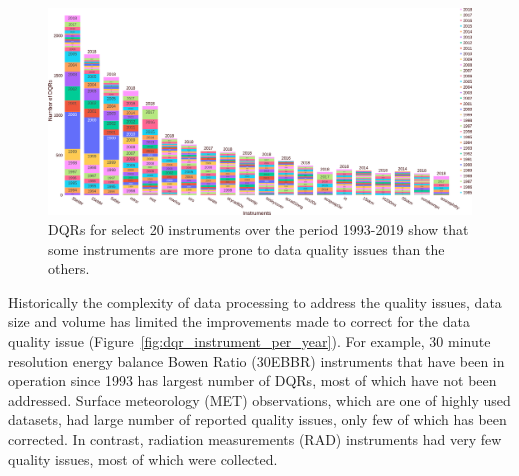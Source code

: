 \begin{figure}
 \includegraphics[width=\linewidth]{figures/dqr_by_instrument_20.png}
 \caption{DQRs for select 20 instruments over the period 1993-2019 show
	 that some instruments are more prone to data quality issues than
		 the others.}
 \label{fig:dqr_by_instrument}
\end{figure}

Historically the complexity of data processing to address the quality
issues, data size and volume has limited the improvements made to
correct for the data quality issue
(Figure~\ref{fig:dqr_instrument_per_year}). For example, 30 minute
resolution energy balance Bowen Ratio (30EBBR)
instruments that have been in operation since 1993 has largest number of
DQRs, most of which have not been addressed. Surface meteorology (MET)
observations, which are one of highly used datasets, had large number of
reported quality issues, only few of which has been corrected. In
contrast, radiation measurements (RAD) instruments had very few quality
issues, most of which were collected. 

